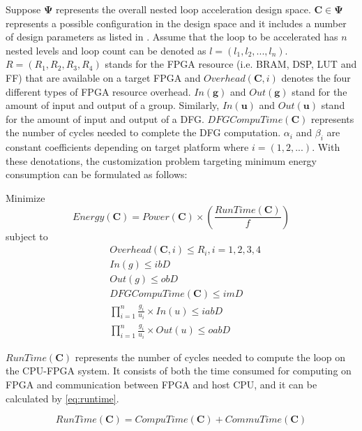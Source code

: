 Suppose $\bm{\Psi}$ represents the overall nested loop acceleration design 
space. $\bm{C} \in \bm{\Psi}$ represents a possible configuration in 
the design space and it includes a number of design parameters as  
listed in . Assume that the loop to be accelerated 
has $n$ nested levels and loop count can be denoted as $l=(l_1, l_2, ..., l_n)$.
$R=(R_1, R_2, R_3, R_4)$ stands for the FPGA resource (i.e. BRAM, DSP, LUT and FF) 
that are available on a target FPGA and $Overhead(\bm{C}, i)$ denotes the 
four different types of FPGA resource overhead. $In(\bm{g})$ and $Out(\bm{g})$ 
stand for the amount of input and output of a group. Similarly, $In(\bm{u})$ 
and $Out(\bm{u})$ stand for the amount of input and output of a DFG. 
$DFGCompuTime(\bm{C})$ represents the number of cycles needed to 
complete the DFG computation. $\alpha_i$ and $\beta_i$ are constant 
coefficients depending on target platform where $i=(1,2,...)$. With these denotations, 
the customization problem targeting minimum energy consumption can be formulated 
as follows:

Minimize 
\begin{equation} \label{eq:energy}
    Energy(\bm{C})=Power(\bm{C}) \times (\frac{RunTime(\bm{C})}{f})
\end{equation}
subject to
\begin{equation} \label{eq:constraints}
    \begin{split}
        &Overhead(\bm{C}, i) \leq R_i, i=1,2,3,4 \\
        &In(g) \leq ibD \\
        &Out(g) \leq obD \\
        &DFGCompuTime(\bm{C}) \leq imD \\
        &\displaystyle \prod_{i=1}^{n} \frac{g_i}{u_i} \times In(u) \leq iabD \\
        &\displaystyle \prod_{i=1}^{n} \frac{g_i}{u_i} \times Out(u) \leq oabD
    \end{split}
\end{equation}

$RunTime(\bm{C})$ represents the number of cycles needed to compute the loop on 
the CPU-FPGA system. It consists of both the time consumed for computing on FPGA and 
communication between FPGA and host CPU, and it can be calculated by \eqref{eq:runtime}.

\begin{equation} \label{eq:runtime}
    RunTime(\bm{C})=CompuTime(\bm{C})+CommuTime(\bm{C})
\end{equation}

